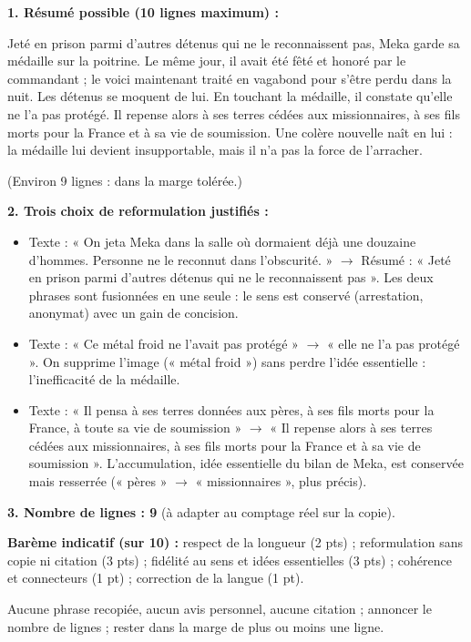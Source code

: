 \documentclass[11pt]{article}
\begin{document}
\begin{corrige}
\textbf{1. Résumé possible (10 lignes maximum) :}

Jeté en prison parmi d'autres détenus qui ne le reconnaissent pas, Meka garde sa médaille sur la poitrine. Le même jour, il avait été fêté et honoré par le commandant ; le voici maintenant traité en vagabond pour s'être perdu dans la nuit. Les détenus se moquent de lui. En touchant la médaille, il constate qu'elle ne l'a pas protégé. Il repense alors à ses terres cédées aux missionnaires, à ses fils morts pour la France et à sa vie de soumission. Une colère nouvelle naît en lui : la médaille lui devient insupportable, mais il n'a pas la force de l'arracher.

(Environ 9 lignes : dans la marge tolérée.)

\textbf{2. Trois choix de reformulation justifiés :}
\begin{itemize}
\item Texte : « On jeta Meka dans la salle où dormaient déjà une douzaine d'hommes. Personne ne le reconnut dans l'obscurité. » $\rightarrow$ Résumé : « Jeté en prison parmi d'autres détenus qui ne le reconnaissent pas ». Les deux phrases sont fusionnées en une seule : le sens est conservé (arrestation, anonymat) avec un gain de concision.
\item Texte : « Ce métal froid ne l'avait pas protégé » $\rightarrow$ « elle ne l'a pas protégé ». On supprime l'image (« métal froid ») sans perdre l'idée essentielle : l'inefficacité de la médaille.
\item Texte : « Il pensa à ses terres données aux pères, à ses fils morts pour la France, à toute sa vie de soumission » $\rightarrow$ « Il repense alors à ses terres cédées aux missionnaires, à ses fils morts pour la France et à sa vie de soumission ». L'accumulation, idée essentielle du bilan de Meka, est conservée mais resserrée (« pères » $\rightarrow$ « missionnaires », plus précis).
\end{itemize}
\textbf{3. Nombre de lignes : 9} (à adapter au comptage réel sur la copie).

\textbf{Barème indicatif (sur 10) :} respect de la longueur (2 pts) ; reformulation sans copie ni citation (3 pts) ; fidélité au sens et idées essentielles (3 pts) ; cohérence et connecteurs (1 pt) ; correction de la langue (1 pt).
\end{corrige}

\begin{attention}
Aucune phrase recopiée, aucun avis personnel, aucune citation ; annoncer le nombre de lignes ; rester dans la marge de plus ou moins une ligne.
\end{attention}
\end{document}
